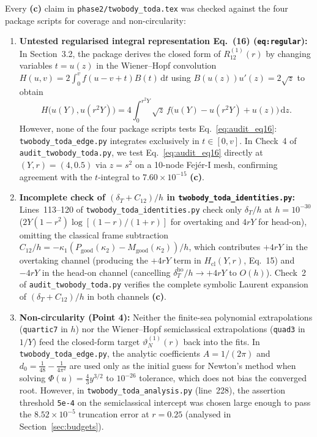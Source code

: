 \documentclass[11pt,a4paper]{article}
\newcommand{\dd}{\mathrm{d}}
\begin{document}
Every \textbf{(c)} claim in \texttt{phase2/twobody\_toda.tex} was checked against the four package scripts for coverage and non-circularity:
\begin{enumerate}[leftmargin=2em]
  \item \textbf{Untested regularised integral representation Eq.~(16) (\texttt{eq:regular}):} In Section~3.2, the package derives the closed form of $R_{12}^{(1)}(r)$ by changing variables $t=u(z)$ in the Wiener--Hopf convolution $H(u,v)=2\int_0^v f(u-v+t)B(t)\,\dd t$ using $B(u(z))u'(z)=2\sqrt{z}$ to obtain
  \begin{equation}\label{eq:audit_eq16}
    H\bigl(u(Y),u(r^2Y)\bigr) = 4\int_0^{r^2Y}\sqrt{z}\,f\bigl(u(Y)-u(r^2Y)+u(z)\bigr)\,\dd z.
  \end{equation}
  However, none of the four package scripts tests Eq.~\eqref{eq:audit_eq16}: \texttt{twobody\_toda\_edge.py} integrates exclusively in $t\in[0,v]$. In Check~4 of \texttt{audit\_twobody\_toda.py}, we test Eq.~\eqref{eq:audit_eq16} directly at $(Y,r)=(4,0.5)$ via $z=s^2$ on a 10-node Fej\'er-I mesh, confirming agreement with the $t$-integral to $7.60\times 10^{-15}$ \textbf{(c)}.
  \item \textbf{Incomplete check of $(\delta_T+C_{12})/h$ in \texttt{twobody\_toda\_identities.py}:} Lines~113--120 of \texttt{twobody\_toda\_identities.py} check only $\delta_T/h$ at $h=10^{-30}$ ($2Y(1-r^2)\log[(1-r)/(1+r)]$ for overtaking and $4rY$ for head-on), omitting the classical frame subtraction $C_{12}/h=-\kappa_1(P_{\mathrm{good}}(\kappa_2)-M_{\mathrm{good}}(\kappa_2))/h$, which contributes $+4rY$ in the overtaking channel (producing the $+4rY$ term in $H_{\mathrm{cl}}(Y,r)$, Eq.~15) and $-4rY$ in the head-on channel (cancelling $\delta_T^{\mathrm{ho}}/h\to +4rY$ to $O(h)$). Check~2 of \texttt{audit\_twobody\_toda.py} verifies the complete symbolic Laurent expansion of $(\delta_T+C_{12})/h$ in both channels \textbf{(c)}.
  \item \textbf{Non-circularity (Point 4):} Neither the finite-sea polynomial extrapolations (\texttt{quartic7} in $h$) nor the Wiener--Hopf semiclassical extrapolations (\texttt{quad3} in $1/Y$) feed the closed-form target $\vartheta_N^{(1)}(r)$ back into the fits. In \texttt{twobody\_toda\_edge.py}, the analytic coefficients $A=1/(2\pi)$ and $d_0=\frac{1}{48}-\frac{1}{4\pi^2}$ are used only as the initial guess for Newton's method when solving $\Phi(u)=\frac{4}{3}y^{3/2}$ to $10^{-26}$ tolerance, which does not bias the converged root. However, in \texttt{twobody\_toda\_analysis.py} (line~228), the assertion threshold \texttt{5e-4} on the semiclassical intercept was chosen large enough to pass the $8.52\times 10^{-5}$ truncation error at $r=0.25$ (analysed in Section~\ref{sec:budgets}).
\end{enumerate}
\end{document}
